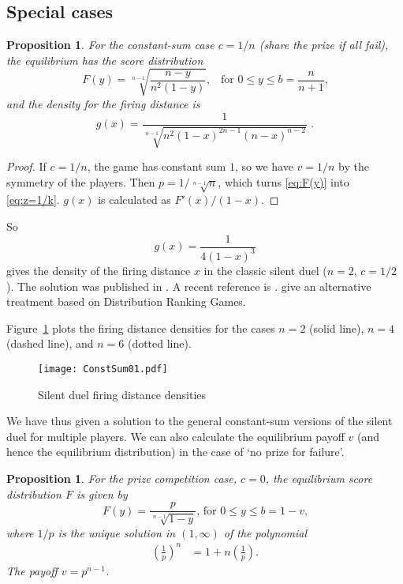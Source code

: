 \documentclass[11pt,a4paper]{article}%
\numberwithin{equation}{section}
\theoremstyle{plain}
\newtheorem{proposition}[theorem]{Proposition}
\begin{document}
\subsection{Special cases}
%
\begin{proposition}
For the constant-sum case $c=1/n$ (share the prize if all fail), the
equilibrium has the score distribution
\begin{equation}
\label{eq:z=1/k}
F(y) = \sqrt[n - 1]{ \frac{n - y}{n^{2}(1 - y)} } \text{,} \quad
\text{for } 0 \leqslant y \leqslant b = \frac{n}{n + 1} \text{,}
\end{equation}
and the density for the firing distance is
\begin{equation*}
g(x) = \frac{1}{\sqrt[n - 1]{n^{2} (1 - x)^{2n - 1} (n - x)^{n - 2}}} \text{ .}
\end{equation*}
\end{proposition}
%
\begin{proof}
If $c=1/n$, the game has constant sum $1$, so we have $v=1/n$ by the symmetry of the players. Then $p = 1/\sqrt[n - 1]{n}$, which turns \eqref{eq:F(y)} into \eqref{eq:z=1/k}. $g(x)$ is calculated as $F'(x)/(1 - x)$.
\end{proof}
%
\par
So
\begin{equation}
g(x) = \frac{1}{4(1 - x)^{3}}
\end{equation}
gives the density of the firing distance $x$ in the classic silent duel ($n = 2$, $c = 1/2$). The solution was published in \cite{karlin1959}. A recent reference is \cite{Owen1995}. \cite{AlpernHoward2017} give an alternative treatment based on Distribution Ranking Games.
%
\par
Figure~\ref{fig:constsum} plots the firing distance densities for the cases $n = 2$ (solid line), $n = 4$ (dashed line), and $n = 6$ (dotted line).
%
\begin{figure}[H]
\centering
\texttt{[image: ConstSum01.pdf]}
\caption{Silent duel firing distance densities}
\label{fig:constsum}
\end{figure}
%
\par
We have thus given a solution to the general constant-sum versions of the silent duel for multiple players. We can also calculate the equilibrium payoff $v$ (and hence the equilibrium distribution) in the case of `no prize for failure'.
%
\begin{proposition}
For the prize competition case, $c=0$, the equilibrium score distribution $F$ is given by
%
\begin{equation}
\label{eq:cforz=0}
F(y) = \frac{p}{\sqrt[n-1]{1 - y}} \text{, for }%
0 \leqslant y \leqslant b = 1 - v \text{,}
\end{equation}
where $1/p$ is the unique solution in $(1, \infty)$ of the polynomial
\begin{align*}
\left( \frac{1}{p} \right) ^{n} &= 1 + n \left( \frac{1}{p} \right) \text{.}
\end{align*}%
The payoff $v = p^{n - 1}$.
%
\end{proposition}
\end{document}
